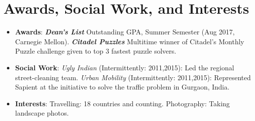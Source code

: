 \documentclass[letterpaper,10.5pt]{article}
\newcommand{\resumeItem}[2]{
  \item\small{
    \textbf{#1}{: #2 \vspace{-2pt}}
  }
}
\newcommand{\resumeItemListStart}{\begin{itemize}}
\newcommand{\resumeItemListEnd}{\end{itemize}\vspace{-5pt}}
\begin{document}
\section{Awards, Social Work, and Interests}
\resumeItemListStart
	\resumeItem{Awards}
	{\textbf{\textit{Dean's List}} Outstanding GPA, Summer Semester (Aug 2017, Carnegie Mellon). \textbf{\textit{Citadel Puzzles}} Multitime winner of Citadel's Monthly Puzzle challenge given to top 3 fastest puzzle solvers.}
	\resumeItem{Social Work}{\textit{Ugly Indian} (Intermittently: 2011,2015): Led the regional street-cleaning team. \textit{Urban Mobility} (Intermittently: 2011,2015): Represented Sapient at the initiative to solve the traffic problem in Gurgaon, India.}
	\resumeItem{Interests}{Travelling: 18 countries and counting. Photography: Taking landscape photos.}
	\resumeItemListEnd
\end{document}
